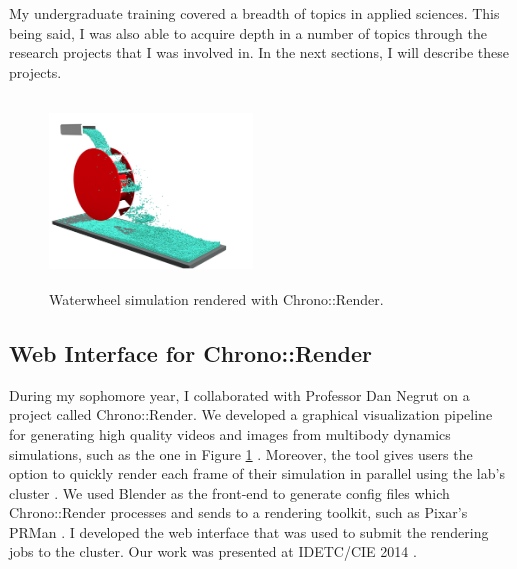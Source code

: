 \documentclass{article}
\theoremstyle{definition}
\begin{document}
My undergraduate training covered a breadth of topics in applied sciences. This being said, I was also able to acquire depth in a number of topics through the research projects that I was involved in. In the next sections, I will describe these projects.

\begin{figure}
    \vspace{-23pt}

  \begin{center}
    \includegraphics[width=0.48\textwidth, height=5cm]{waterwheel.png}
  \end{center}
   \vspace{-15pt}

  \caption{Waterwheel simulation rendered with Chrono::Render.}\label{Fig:foam}
   \vspace{-5pt}

\end{figure}

\subsection*{Web Interface for Chrono::Render}
During my sophomore year, I collaborated with Professor Dan Negrut on a project called Chrono::Render. We developed a graphical visualization pipeline for generating high quality videos and images from multibody dynamics simulations, such as the one in Figure \ref{Fig:foam} \cite{chronoRender}. Moreover, the tool gives users the option to quickly render each frame of their simulation in parallel using the lab's cluster \cite{eulerCluster}. We used Blender \cite{blender1, blender2} as the front-end to generate config files which Chrono::Render processes and sends to a rendering toolkit, such as Pixar's PRMan \cite{prman}. I developed the web interface that was used to submit the rendering jobs to the cluster. Our work was presented at IDETC/CIE 2014 \cite{chronoRender}. 

\newpage
\end{document}
